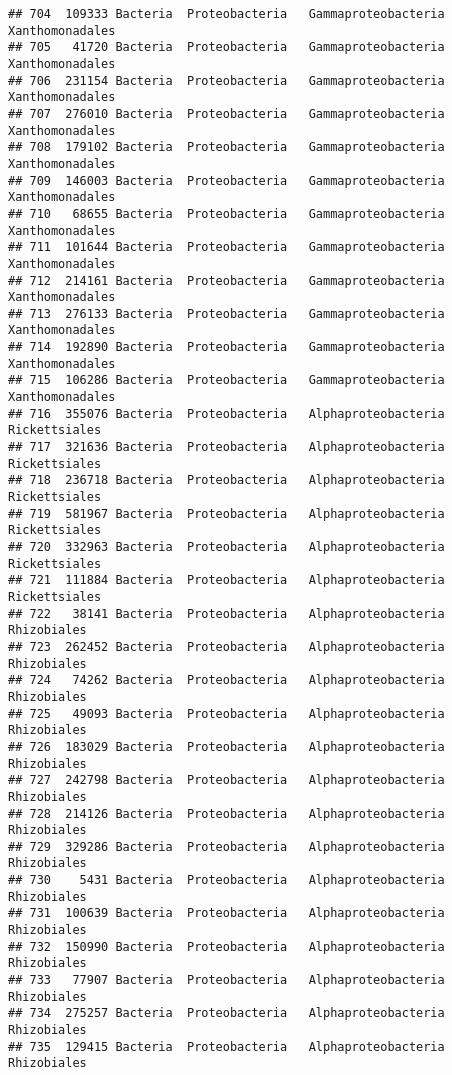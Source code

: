 \documentclass[
]{article}
\begin{document}
\begin{verbatim}
## 704  109333 Bacteria  Proteobacteria   Gammaproteobacteria     Xanthomonadales
## 705   41720 Bacteria  Proteobacteria   Gammaproteobacteria     Xanthomonadales
## 706  231154 Bacteria  Proteobacteria   Gammaproteobacteria     Xanthomonadales
## 707  276010 Bacteria  Proteobacteria   Gammaproteobacteria     Xanthomonadales
## 708  179102 Bacteria  Proteobacteria   Gammaproteobacteria     Xanthomonadales
## 709  146003 Bacteria  Proteobacteria   Gammaproteobacteria     Xanthomonadales
## 710   68655 Bacteria  Proteobacteria   Gammaproteobacteria     Xanthomonadales
## 711  101644 Bacteria  Proteobacteria   Gammaproteobacteria     Xanthomonadales
## 712  214161 Bacteria  Proteobacteria   Gammaproteobacteria     Xanthomonadales
## 713  276133 Bacteria  Proteobacteria   Gammaproteobacteria     Xanthomonadales
## 714  192890 Bacteria  Proteobacteria   Gammaproteobacteria     Xanthomonadales
## 715  106286 Bacteria  Proteobacteria   Gammaproteobacteria     Xanthomonadales
## 716  355076 Bacteria  Proteobacteria   Alphaproteobacteria       Rickettsiales
## 717  321636 Bacteria  Proteobacteria   Alphaproteobacteria       Rickettsiales
## 718  236718 Bacteria  Proteobacteria   Alphaproteobacteria       Rickettsiales
## 719  581967 Bacteria  Proteobacteria   Alphaproteobacteria       Rickettsiales
## 720  332963 Bacteria  Proteobacteria   Alphaproteobacteria       Rickettsiales
## 721  111884 Bacteria  Proteobacteria   Alphaproteobacteria       Rickettsiales
## 722   38141 Bacteria  Proteobacteria   Alphaproteobacteria         Rhizobiales
## 723  262452 Bacteria  Proteobacteria   Alphaproteobacteria         Rhizobiales
## 724   74262 Bacteria  Proteobacteria   Alphaproteobacteria         Rhizobiales
## 725   49093 Bacteria  Proteobacteria   Alphaproteobacteria         Rhizobiales
## 726  183029 Bacteria  Proteobacteria   Alphaproteobacteria         Rhizobiales
## 727  242798 Bacteria  Proteobacteria   Alphaproteobacteria         Rhizobiales
## 728  214126 Bacteria  Proteobacteria   Alphaproteobacteria         Rhizobiales
## 729  329286 Bacteria  Proteobacteria   Alphaproteobacteria         Rhizobiales
## 730    5431 Bacteria  Proteobacteria   Alphaproteobacteria         Rhizobiales
## 731  100639 Bacteria  Proteobacteria   Alphaproteobacteria         Rhizobiales
## 732  150990 Bacteria  Proteobacteria   Alphaproteobacteria         Rhizobiales
## 733   77907 Bacteria  Proteobacteria   Alphaproteobacteria         Rhizobiales
## 734  275257 Bacteria  Proteobacteria   Alphaproteobacteria         Rhizobiales
## 735  129415 Bacteria  Proteobacteria   Alphaproteobacteria         Rhizobiales

\end{verbatim}
\end{document}
